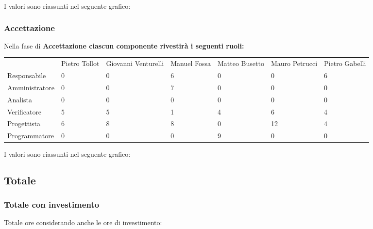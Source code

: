 I valori sono riassunti nel seguente grafico:


\subsubsection{Accettazione}
Nella fase di \bf{Accettazione} ciascun componente rivestir\`{a} i seguenti ruoli:

\begin{table}[h]  %
\begin{tabular}{lllllll}
               & Pietro Tollot & Giovanni Venturelli & Manuel Fossa & Matteo Busetto & Mauro Petrucci & Pietro Gabelli \\
Responsabile   & 0             & 0                   & 6            & 0              & 0              & 6              \\
Amministratore & 0             & 0                   & 7            & 0              & 0              & 0              \\
Analista       & 0             & 0                   & 0            & 0              & 0              & 0              \\
Verificatore   & 5             & 5                   & 1            & 4              & 6              & 4              \\
Progettista    & 6             & 8                   & 8            & 0              & 12             & 4              \\
Programmatore  & 0             & 0                   & 0            & 9              & 0              & 0             
\end{tabular}
\end{table}

I valori sono riassunti nel seguente grafico:


\subsection{Totale}
\subsubsection{Totale con investimento}
Totale ore considerando anche le ore di investimento:

